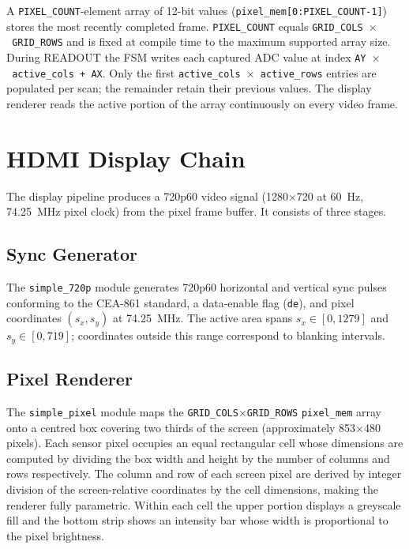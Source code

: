 A \texttt{PIXEL\_COUNT}-element array of 12-bit values (\texttt{pixel\_mem[0:PIXEL\_COUNT-1]}) stores the most recently completed frame. \texttt{PIXEL\_COUNT} equals \texttt{GRID\_COLS~$\times$~GRID\_ROWS} and is fixed at compile time to the maximum supported array size. During READOUT the FSM writes each captured ADC value at index \texttt{AY~$\times$~active\_cols~+~AX}. Only the first \texttt{active\_cols~$\times$~active\_rows} entries are populated per scan; the remainder retain their previous values. The display renderer reads the active portion of the array continuously on every video frame.

\section{HDMI Display Chain}

The display pipeline produces a 720p60 video signal (1280$\times$720 at 60~Hz, 74.25~MHz pixel clock) from the pixel frame buffer. It consists of three stages.

\subsection{Sync Generator}

The \texttt{simple\_720p} module generates 720p60 horizontal and vertical sync pulses conforming to the CEA-861 standard, a data-enable flag (\texttt{de}), and pixel coordinates $(s_x, s_y)$ at 74.25~MHz. The active area spans
$s_x \in [0, 1279]$ and $s_y \in [0, 719]$; coordinates outside this range correspond to blanking intervals.

\subsection{Pixel Renderer}

The \texttt{simple\_pixel} module maps the \texttt{GRID\_COLS}$\times$\texttt{GRID\_ROWS} \texttt{pixel\_mem} array onto a centred box covering two thirds of the screen (approximately 853$\times$480 pixels). Each sensor pixel occupies an equal rectangular cell whose dimensions are computed by dividing the box width and height by the number of columns and rows respectively. The column and row of each screen pixel are derived by integer division of the screen-relative coordinates by the cell dimensions, making the renderer fully parametric. Within each cell the upper portion displays a greyscale fill and the bottom strip shows an intensity bar whose width is proportional to the pixel brightness.

